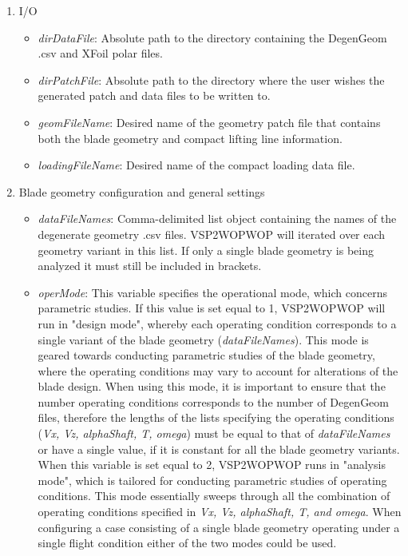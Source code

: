 \documentclass[journal ]{new-aiaa}
\begin{document}
\begin{enumerate}
\item I/O
\begin{itemize}
\item \textit{dirDataFile}: Absolute path to the directory containing the DegenGeom .csv and XFoil polar files. 
\item \textit{dirPatchFile}: Absolute path to the directory where the user wishes the generated patch and data files to be written to.
\item \textit{geomFileName}: Desired name of the geometry patch file that contains both the blade geometry and compact lifting line information.  
\item \textit{loadingFileName}: Desired name of the compact loading data file.
\end{itemize}
\item Blade geometry configuration and general settings 
\begin{itemize}
\item \textit{dataFileNames}: Comma-delimited list object containing the names of the degenerate geometry .csv files. VSP2WOPWOP will iterated over each geometry variant in this list. If only a single blade geometry is being analyzed it must still be included in brackets. 
\item \textit{operMode}: This variable specifies the operational mode, which concerns parametric studies. If this value is set equal to 1, VSP2WOPWOP will run in "design mode", whereby each operating condition corresponds to a single variant of the blade geometry (\textit{dataFileNames}). This mode is geared towards conducting parametric studies of the blade geometry, where the operating conditions may vary to account for alterations of the blade design. When using this mode, it is important to ensure that the number operating conditions corresponds to the number of DegenGeom files, therefore the lengths of the lists specifying the operating conditions (\textit{Vx, Vz, alphaShaft, T, omega}) must be equal to that of \textit{dataFileNames} or have a single value, if it is constant for all the blade geometry variants. When this variable is set equal to 2, VSP2WOPWOP runs in "analysis mode", which is tailored for conducting parametric studies of operating conditions. This mode essentially sweeps through all the combination of operating conditions specified in \textit{Vx, Vz, alphaShaft, T, and omega}. When configuring a case consisting of a single blade geometry operating under a single flight condition either of the two modes could be used. 

\end{itemize}
\end{enumerate}
\end{document}
